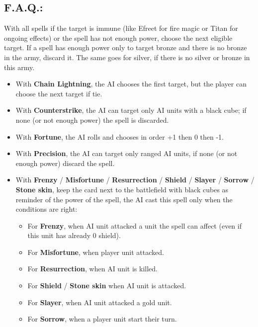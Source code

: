 \newpage

\subsection*{\MakeUppercase{F.A.Q.:}}

\begin{multicols}{2}
With all spells if the target is immune (like Efreet for fire magic or Titan for ongoing effects) or the spell has not enough power, choose the next eligible target. If a spell has enough power only to target bronze and there is no bronze in the army, discard it. The same goes for silver, if there is no silver or bronze in this army.

\begin{itemize}
    \item With \textbf{Chain Lightning}, the AI chooses the first target, but the player can choose the next target if tie.
    \item With \textbf{Counterstrike}, the AI can target only AI units with a black cube; if none (or not enough power) the spell is discarded.
    \item With \textbf{Fortune}, the AI rolls and chooses in order +1 then 0 then -1.
    \item With \textbf{Precision}, the AI can target only ranged AI units, if none (or not enough power) discard the spell.
    \item With \textbf{Frenzy} / \textbf{Misfortune} / \textbf{Resurrection} / \textbf{Shield} / \textbf{Slayer} / \textbf{Sorrow} / \textbf{Stone skin}, keep the card next to the battlefield with black cubes as reminder of the power of the spell, the AI cast this spell only when the conditions are right: 
    \begin{itemize}
        \item For \textbf{Frenzy}, when AI unit attacked a unit the spell can affect (even if this unit has already 0 shield).
        \item For \textbf{Misfortune}, when player unit attacked.
        \item For \textbf{Resurrection}, when AI unit is killed.
        \item For \textbf{Shield} / \textbf{Stone skin} when AI unit is attacked.
        \item For \textbf{Slayer}, when AI unit attacked a gold unit.
        \item For \textbf{Sorrow}, when a player unit start their turn.
    \end{itemize}

\end{itemize}
\end{multicols}
